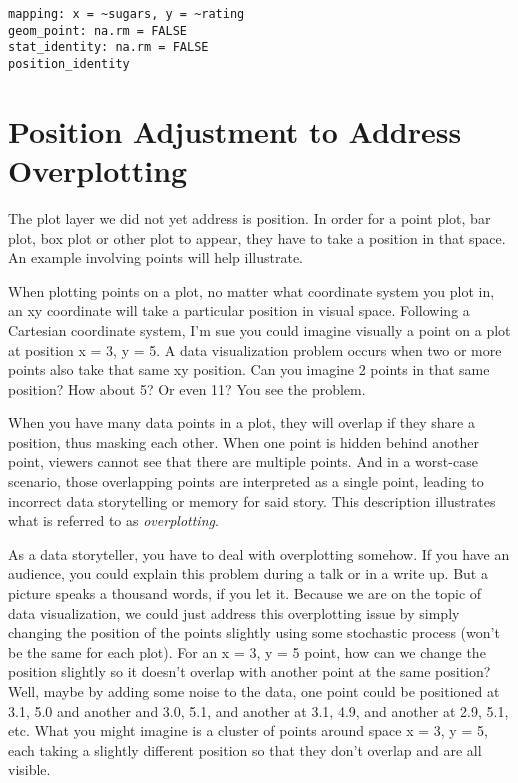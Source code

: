 \documentclass[
  letterpaper,
  DIV=11,
  numbers=noendperiod]{scrartcl}
\begin{document}
\begin{verbatim}
mapping: x = ~sugars, y = ~rating 
geom_point: na.rm = FALSE
stat_identity: na.rm = FALSE
position_identity 
\end{verbatim}

\hypertarget{position-adjustment-to-address-overplotting}{%
\section{\texorpdfstring{\textbf{Position Adjustment to Address
Overplotting}}{Position Adjustment to Address Overplotting}}\label{position-adjustment-to-address-overplotting}}

The plot layer we did not yet address is position. In order for a point
plot, bar plot, box plot or other plot to appear, they have to take a
position in that space. An example involving points will help
illustrate.

When plotting points on a plot, no matter what coordinate system you
plot in, an xy coordinate will take a particular position in visual
space. Following a Cartesian coordinate system, I'm sue you could
imagine visually a point on a plot at position x = 3, y = 5. A data
visualization problem occurs when two or more points also take that same
xy position. Can you imagine 2 points in that same position? How about
5? Or even 11? You see the problem.

When you have many data points in a plot, they will overlap if they
share a position, thus masking each other. When one point is hidden
behind another point, viewers cannot see that there are multiple points.
And in a worst-case scenario, those overlapping points are interpreted
as a single point, leading to incorrect data storytelling or memory for
said story. This description illustrates what is referred to as
\emph{overplotting}.

As a data storyteller, you have to deal with overplotting somehow. If
you have an audience, you could explain this problem during a talk or in
a write up. But a picture speaks a thousand words, if you let it.
Because we are on the topic of data visualization, we could just address
this overplotting issue by simply changing the position of the points
slightly using some stochastic process (won't be the same for each
plot). For an x = 3, y = 5 point, how can we change the position
slightly so it doesn't overlap with another point at the same position?
Well, maybe by adding some noise to the data, one point could be
positioned at 3.1, 5.0 and another and 3.0, 5.1, and another at 3.1,
4.9, and another at 2.9, 5.1, etc. What you might imagine is a cluster
of points around space x = 3, y = 5, each taking a slightly different
position so that they don't overlap and are all visible.
\end{document}
